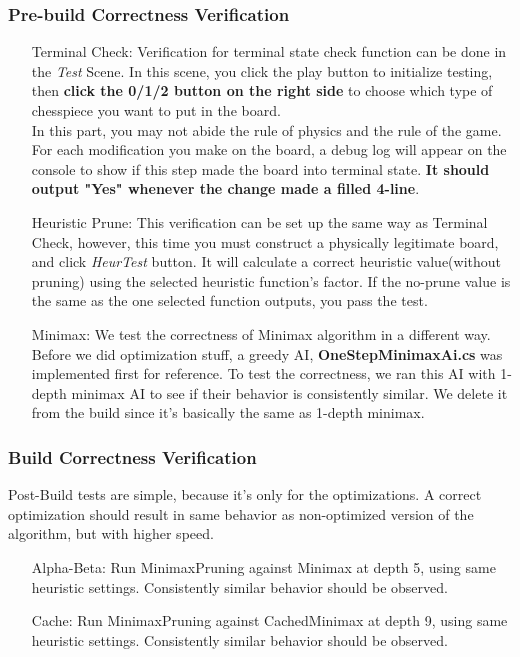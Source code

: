 \documentclass[12pt,a4paper]{article}
\begin{document}
	\subsubsection{Pre-build Correctness Verification}
	\begin{enumerate}
		\item [Terminal Check:] Verification for terminal state check function can be done in the \textit{Test} Scene. In this scene, you click the play button to initialize testing, then \textbf{click the 0/1/2 button on the right side} to choose which type of chesspiece you want to put in the board.\\
		In this part, you may not abide the rule of physics and the rule of the game. For each modification you make on the board, a debug log will appear on the console to show if this step made the board into terminal state. \textbf{It should output "Yes" whenever the change made a filled 4-line}.\\
		
		\item [Heuristic Prune:] This verification can be set up the same way as Terminal Check, however, this time you must construct a physically legitimate board, and click \textit{HeurTest} button. It will calculate a correct heuristic value(without pruning) using the selected heuristic function's factor. If the no-prune value is the same as the one selected function outputs, you pass the test.\\
		
		\item [Minimax:] We test the correctness of Minimax algorithm in a different way. Before we did optimization stuff, a greedy AI, \textbf{OneStepMinimaxAi.cs} was implemented first for reference. To test the correctness, we ran this AI with 1-depth minimax AI to see if their behavior is consistently similar. We delete it from the build since it's basically the same as 1-depth minimax.
	\end{enumerate}
	\subsubsection{Build Correctness Verification}
	Post-Build tests are simple, because it's only for the optimizations. A correct optimization should result in same behavior as non-optimized version of the algorithm, but with higher speed.
	\begin{enumerate}
		\item [Alpha-Beta:] Run MinimaxPruning against Minimax at depth 5, using same heuristic settings. Consistently similar behavior should be observed.
		\item [Cache:] Run MinimaxPruning against CachedMinimax at depth 9, using same heuristic settings. Consistently similar behavior should be observed.
	\end{enumerate}
\end{document}
